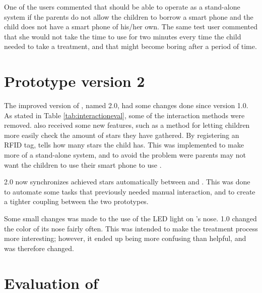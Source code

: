 One of the users commented that \ab{} should be able to operate as a stand-alone system if the parents do not allow the children to borrow a smart phone and the child does not have a smart phone of his/her own. The same test user commented that she would not take the time to use \ab{} for two minutes every time the child needed to take a treatment, and that \ab{} might become boring after a period of time. 


	
\section{Prototype version 2}
\label{sec:abversion2}
The improved version of \ab{}, named \ab{} 2.0, had some changes done since version 1.0. As stated in Table \ref{tab:interactioneval}, some of the interaction methods were removed. \ab{} also received some new features, such as a method for letting children more easily check the amount of stars they have gathered. By registering an RFID tag, \ab{} tells how many stars the child has. This was implemented to make \ab{} more of a stand-alone system, and to avoid the problem were parents may not want the children to use their smart phone to use \app{}. 

\ab{} 2.0 now synchronizes achieved stars automatically between \app{} and \ab{}. This was done to automate some tasks that previously needed manual interaction, and to create a tighter coupling between the two prototypes. 

Some small changes was made to the use of the LED light on \ab{}'s nose. \ab{} 1.0 changed the color of its nose fairly often. This was intended to make the treatment process more interesting; however, it ended up being more confusing than helpful, and was therefore changed. 


\section{Evaluation of \ab{}}

